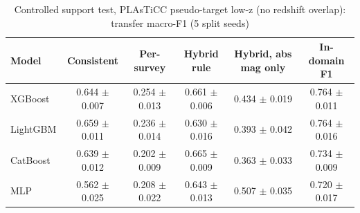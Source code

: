 \begin{table}
\centering
\caption{Controlled support test, PLAsTiCC pseudo-target low-z (no redshift overlap): transfer macro-F1 (5 split seeds)}
\begin{tabular}{lccccc}
\hline
Model & Consistent & Per-survey & Hybrid rule & Hybrid, abs mag only & In-domain F1 \\
\hline
XGBoost & 0.644 $\pm$ 0.007 & 0.254 $\pm$ 0.013 & 0.661 $\pm$ 0.006 & 0.434 $\pm$ 0.019 & 0.764 $\pm$ 0.011 \\
LightGBM & 0.659 $\pm$ 0.011 & 0.236 $\pm$ 0.014 & 0.630 $\pm$ 0.016 & 0.393 $\pm$ 0.042 & 0.764 $\pm$ 0.016 \\
CatBoost & 0.639 $\pm$ 0.012 & 0.202 $\pm$ 0.009 & 0.665 $\pm$ 0.009 & 0.363 $\pm$ 0.033 & 0.734 $\pm$ 0.009 \\
MLP & 0.562 $\pm$ 0.025 & 0.208 $\pm$ 0.022 & 0.643 $\pm$ 0.013 & 0.507 $\pm$ 0.035 & 0.720 $\pm$ 0.017 \\
\hline
\end{tabular}
\end{table}
